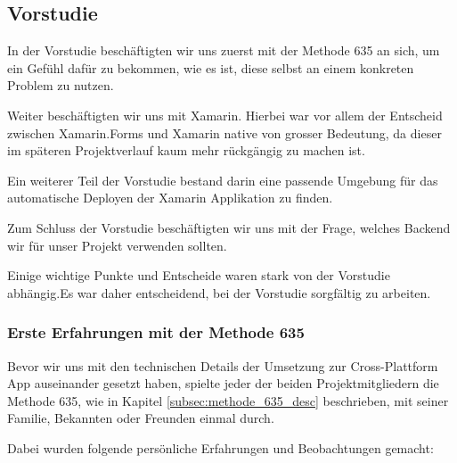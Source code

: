 \subsection{Vorstudie}
\label{vorstudie}
In der Vorstudie beschäftigten wir uns zuerst mit der Methode 635 an sich, um ein Gefühl dafür zu bekommen, wie es ist, diese selbst an einem konkreten Problem zu nutzen. 

Weiter beschäftigten wir uns mit Xamarin. Hierbei war vor allem der Entscheid zwischen Xamarin.Forms und Xamarin native von grosser Bedeutung, da dieser im späteren Projektverlauf kaum mehr rückgängig zu machen ist.

Ein weiterer Teil der Vorstudie bestand darin eine passende Umgebung  für das automatische Deployen der Xamarin Applikation zu finden. 

Zum Schluss der Vorstudie beschäftigten wir uns mit der Frage, welches Backend wir für unser Projekt verwenden sollten.

Einige wichtige Punkte und Entscheide waren stark von der Vorstudie abhängig.Es war daher entscheidend, bei der Vorstudie sorgfältig zu arbeiten.


\subsubsection{Erste Erfahrungen mit der Methode 635} \label{subsub:erste_erfahrungen_mit_methode_635}
Bevor wir uns mit den technischen Details der Umsetzung zur Cross-Plattform App auseinander gesetzt haben, spielte jeder der beiden Projektmitgliedern die Methode 635, wie in Kapitel \ref{subsec:methode_635_desc} beschrieben, mit seiner Familie, Bekannten oder Freunden einmal durch. 

Dabei wurden folgende persönliche Erfahrungen und Beobachtungen gemacht:

